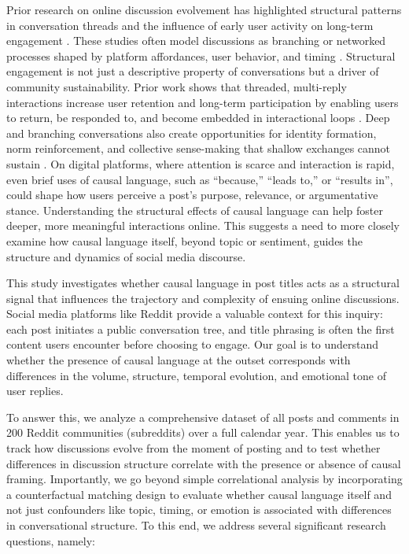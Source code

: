 \documentclass[acmsmall]{acmart}
\begin{document}
 Prior research on online discussion evolvement has highlighted structural patterns in conversation threads and the influence of early user activity on long-term engagement \cite{gomez2008statistical, kumar2010dynamics, medvedev2019modelling}. These studies often model discussions as branching or networked processes shaped by platform affordances, user behavior, and timing \cite{aragon2017generative, medvedev2017anatomy, yu2024characterizing}. Structural engagement is not just a descriptive property of conversations but a driver of community sustainability. Prior work shows that threaded, multi-reply interactions increase user retention and long-term participation by enabling users to return, be responded to, and become embedded in interactional loops \cite{budak2017threading, gomez2013likelihood, krohn2019modelling}. Deep and branching conversations also create opportunities for identity formation, norm reinforcement, and collective sense-making that shallow exchanges cannot sustain \cite{kumar2010dynamics, medvedev2019modelling}.  On digital platforms, where attention is scarce and interaction is rapid, even brief uses of causal language, such as ``because,'' ``leads to,'' or ``results in'', could shape how users perceive a post’s purpose, relevance, or argumentative stance. Understanding the structural effects of causal language can help   foster deeper, more meaningful interactions online. This suggests a need to more closely examine how causal language itself, beyond topic or sentiment, guides the structure and dynamics of social media discourse.



This study investigates whether causal language in post titles acts as a structural signal that influences the trajectory and complexity of ensuing online discussions. Social media platforms like Reddit provide a valuable context for this inquiry: each post initiates a public conversation tree, and title phrasing is often the first content users encounter before choosing to engage. Our goal is to understand whether the presence of causal language at the outset corresponds with differences in the volume, structure, temporal evolution, and emotional tone of user replies.

To answer this, we analyze a comprehensive dataset of all posts and comments in 200 Reddit communities (subreddits) over a full calendar year. This enables us to track how discussions evolve from the moment of posting and to test whether differences in discussion structure correlate with the presence or absence of causal framing. Importantly, we go beyond simple correlational analysis by incorporating a counterfactual matching design to evaluate whether causal language itself and not just confounders like topic, timing, or emotion is associated with differences in conversational structure. To this end,  we address several significant research questions, namely: 
\end{document}
